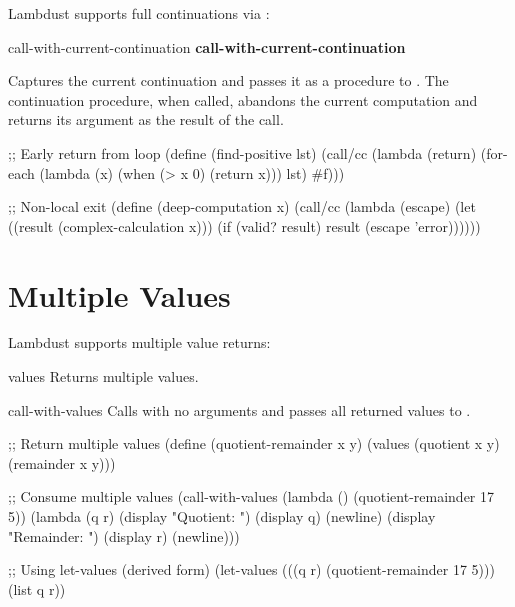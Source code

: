 
Lambdust supports full continuations via :

\begin{procspec}{call-with-current-continuation}
\textbf{call-with-current-continuation}  \goesto{} 

Captures the current continuation and passes it as a procedure to . The continuation procedure, when called, abandons the current computation and returns its argument as the result of the  call.
\end{procspec}

\begin{example}[Continuations]
\begin{lambdustcode}
;; Early return from loop
(define (find-positive lst)
  (call/cc 
    (lambda (return)
      (for-each 
        (lambda (x) 
          (when (> x 0) (return x)))
        lst)
      #f)))

;; Non-local exit
(define (deep-computation x)
  (call/cc
    (lambda (escape)
      (let ((result (complex-calculation x)))
        (if (valid? result)
            result
            (escape 'error))))))
\end{lambdustcode}
\end{example}

\section{Multiple Values}
\label{sec:multiple-values}


Lambdust supports multiple value returns:

\begin{procspec}{values }
Returns multiple values.
\end{procspec}

\begin{procspec}{call-with-values  }
Calls  with no arguments and passes all returned values to .
\end{procspec}

\begin{example}
\begin{lambdustcode}
;; Return multiple values
(define (quotient-remainder x y)
  (values (quotient x y) (remainder x y)))

;; Consume multiple values  
(call-with-values 
  (lambda () (quotient-remainder 17 5))
  (lambda (q r) 
    (display "Quotient: ") (display q) (newline)
    (display "Remainder: ") (display r) (newline)))

;; Using let-values (derived form)
(let-values (((q r) (quotient-remainder 17 5)))
  (list q r))
\end{lambdustcode}
\end{example}

